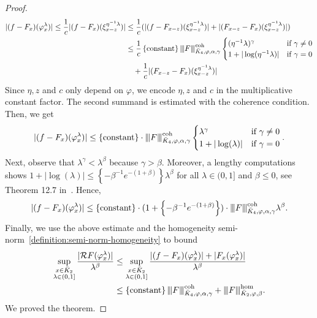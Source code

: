 \begin{proof}
  \begin{align*}
    |(f - F_x)(\varphi^\lambda_x)| \leq \frac{1}{c}|(f - F_x)(\xi^{\eta^{-1}\lambda}_{x - z})| &\leq \frac{1}{c}(|(f - F_{x- z})(\xi^{\eta^{-1}\lambda}_{x - z})| + |(F_{x -z} - F_x)(\xi^{\eta^{-1}\lambda}_{x - z})|) \\
    &\leq \frac{1}{c}\left\{ \mathrm{constant} \right\} {\left\vert\kern-0.25ex\left\vert\kern-0.25ex\left\vert F \right\vert\kern-0.25ex\right\vert\kern-0.25ex\right\vert}^{\mathrm{coh}}_{\bar{K}_{4}, \varphi, \alpha, \gamma} \begin{cases}
      (\eta^{-1}\lambda)^\gamma  \quad &\text{if \( \gamma \neq 0 \)}\\
      1 + |\log(\eta^{-1}\lambda)| & \text{if \( \gamma = 0 \)}
    \end{cases} \\ 
     &\hspace{1em}+ \frac{1}{c}|(F_{x -z} - F_x)(\xi^{\eta^{-1}\lambda}_{x - z})|
  \end{align*}
  Since \( \eta, z \) and \( c \) only depend on \( \varphi \), we encode \( \eta, z \) and \( c \) in the multiplicative constant factor. The second summand is estimated with the coherence condition. Then, we get
  \begin{align*}
    |(f - F_x)(\varphi^\lambda_x)| \leq \left\{ \mathrm{constant} \right\} \cdot {\left\vert\kern-0.25ex\left\vert\kern-0.25ex\left\vert F \right\vert\kern-0.25ex\right\vert\kern-0.25ex\right\vert}^{\mathrm{coh}}_{\bar{K}_{4}, \varphi, \alpha, \gamma}\begin{cases}
      \lambda^\gamma  \quad &\text{if \( \gamma \neq 0 \)}\\
      1 + |\log(\lambda)| & \text{if \( \gamma = 0 \)}
    \end{cases}.
  \end{align*}
  Next, observe that \( \lambda^\gamma < \lambda^\beta \) because \( \gamma > \beta \). Moreover, a lengthy computations shows \( 1 + |\log(\lambda)| \leq \left\{ -\beta^{-1}e^{-(1 + \beta)} \right\}\lambda^\beta \) for all \( \lambda \in (0,1] \) and \( \beta \leq 0 \), see Theorem 12.7 in~\cite{caravenna2021hairer}. Hence,
  \begin{align*}
    |(f - F_x)(\varphi^\lambda_x)| \leq \left\{ \mathrm{constant} \right\} \cdot (1 + \left\{ -\beta^{-1}e^{-(1 + \beta)}\right \}) \cdot {\left\vert\kern-0.25ex\left\vert\kern-0.25ex\left\vert F \right\vert\kern-0.25ex\right\vert\kern-0.25ex\right\vert}^{\mathrm{coh}}_{\bar{K}_{4}, \varphi, \alpha, \gamma}  \lambda^\beta.
  \end{align*}
  Finally, we use the above estimate and the homogeneity semi-norm~\eqref{definition:semi-norm-homogeneity} to bound
  \begin{align*}
    \sup_{\substack{x \in \bar{K}_{2} \\ \lambda \in (0,1]}} 
    \frac{|\mathcal{R}F(\varphi^{\lambda}_x)|}{\lambda^\beta} 
    &\leq 
    \sup_{\substack{x \in \bar{K}_{2} \\ \lambda \in (0,1]}} 
    \frac{|(f - F_x)(\varphi^{\lambda}_x)| + |F_x(\varphi^\lambda_x)|}{\lambda^\beta} \\
    &\leq \left\{ \mathrm{constant} \right\} {\left\vert\kern-0.25ex\left\vert\kern-0.25ex\left\vert F \right\vert\kern-0.25ex\right\vert\kern-0.25ex\right\vert}^{\mathrm{coh}}_{\bar{K}_{4}, \varphi, \alpha, \gamma} + {\left\vert\kern-0.25ex\left\vert\kern-0.25ex\left\vert F \right\vert\kern-0.25ex\right\vert\kern-0.25ex\right\vert}^{\mathrm{\hom}}_{\bar{K}_{2}, \varphi, \beta} .
  \end{align*}
  We proved the theorem.
\end{proof}

